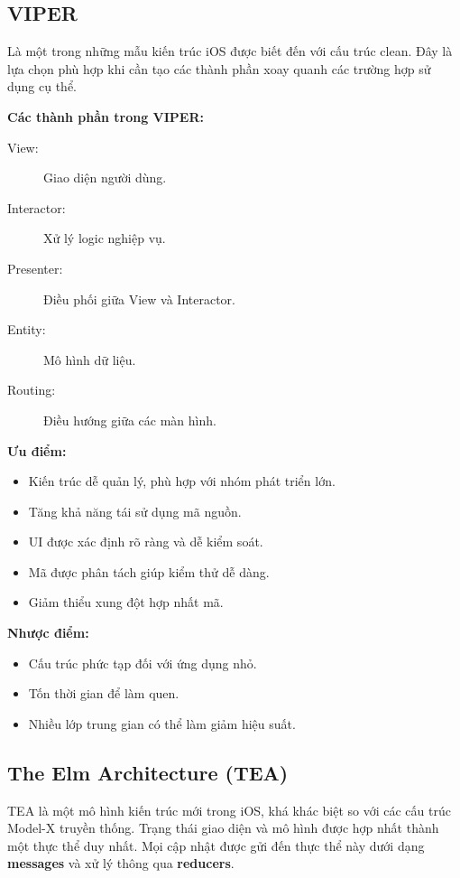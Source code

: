     \subsection{VIPER}

    Là một trong những mẫu kiến trúc iOS được biết đến với cấu trúc clean. Đây là lựa chọn phù hợp khi cần tạo các thành phần xoay quanh các trường hợp sử dụng cụ thể.
    
    \textbf{Các thành phần trong VIPER:}
    \begin{description}
      \item[View:] Giao diện người dùng.
      \item[Interactor:] Xử lý logic nghiệp vụ.
      \item[Presenter:] Điều phối giữa View và Interactor.
      \item[Entity:] Mô hình dữ liệu.
      \item[Routing:] Điều hướng giữa các màn hình.
    \end{description}
    
    \textbf{Ưu điểm:}
    \begin{itemize}
      \item Kiến trúc dễ quản lý, phù hợp với nhóm phát triển lớn.
      \item Tăng khả năng tái sử dụng mã nguồn.
      \item UI được xác định rõ ràng và dễ kiểm soát.
      \item Mã được phân tách giúp kiểm thử dễ dàng.
      \item Giảm thiểu xung đột hợp nhất mã.
    \end{itemize}
    
    \textbf{Nhược điểm:}
    \begin{itemize}
      \item Cấu trúc phức tạp đối với ứng dụng nhỏ.
      \item Tốn thời gian để làm quen.
      \item Nhiều lớp trung gian có thể làm giảm hiệu suất.
    \end{itemize}
    
    \subsection{The Elm Architecture (TEA)}
    
    TEA là một mô hình kiến trúc mới trong iOS, khá khác biệt so với các cấu trúc Model-X truyền thống. Trạng thái giao diện và mô hình được hợp nhất thành một thực thể duy nhất. Mọi cập nhật được gửi đến thực thể này dưới dạng \textbf{messages} và xử lý thông qua \textbf{reducers}.
    
